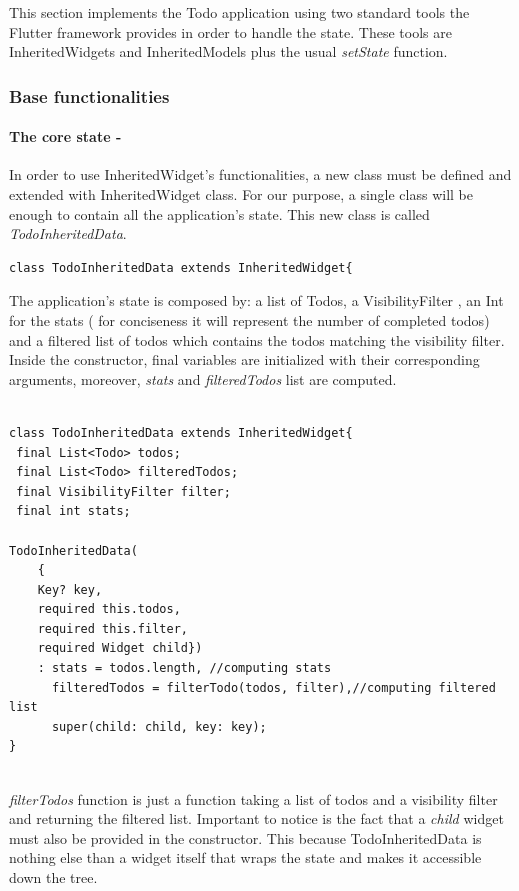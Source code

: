 This section implements the Todo application using two standard tools the Flutter framework provides in order to handle the state. These tools are InheritedWidgets and InheritedModels plus the usual \textit{setState} function.

\subsubsection{Base functionalities} 
\label{par:todo_app_inherited_widget_base_app}

\paragraph{The core state - }
\label{subpar:todo_app_inherited_widget_core_state}
In order to use InheritedWidget's functionalities, a new class must be defined and extended with InheritedWidget class. For our purpose, a single class will be enough to contain all the application's state. This new class is called \textit{TodoInheritedData}.
\begin{code}
\mbox{}
 \mbox{}
		\label{code:2.14}
\begin{verbatim}
class TodoInheritedData extends InheritedWidget{
\end{verbatim}
\mbox{}
\end{code}

The application's state is composed by: a list of Todos, a VisibilityFilter , an Int for the stats ( for conciseness it will represent the number of completed todos) and a filtered list of todos which contains the todos matching the visibility filter. Inside the constructor, final variables are initialized with their corresponding arguments, moreover, \textit{stats} and \textit{filteredTodos} list are computed. 
\mbox{}\\
\begin{code}
\mbox{}
\label{code:2.15}
\begin{verbatim}

class TodoInheritedData extends InheritedWidget{
 final List<Todo> todos;
 final List<Todo> filteredTodos;
 final VisibilityFilter filter;
 final int stats;
 
TodoInheritedData(
    { 
    Key? key,
    required this.todos,
    required this.filter,
    required Widget child})
    : stats = todos.length, //computing stats
      filteredTodos = filterTodo(todos, filter),//computing filtered list
      super(child: child, key: key);
}
\end{verbatim}
\end{code}
\mbox{}\\
\textit{filterTodos} function is just a function taking a list of todos and a visibility filter and returning the filtered list. Important to notice is the fact that a \textit{child} widget must also be provided in the constructor. This because TodoInheritedData is nothing else than a widget itself that wraps the state and makes it accessible down the tree.

